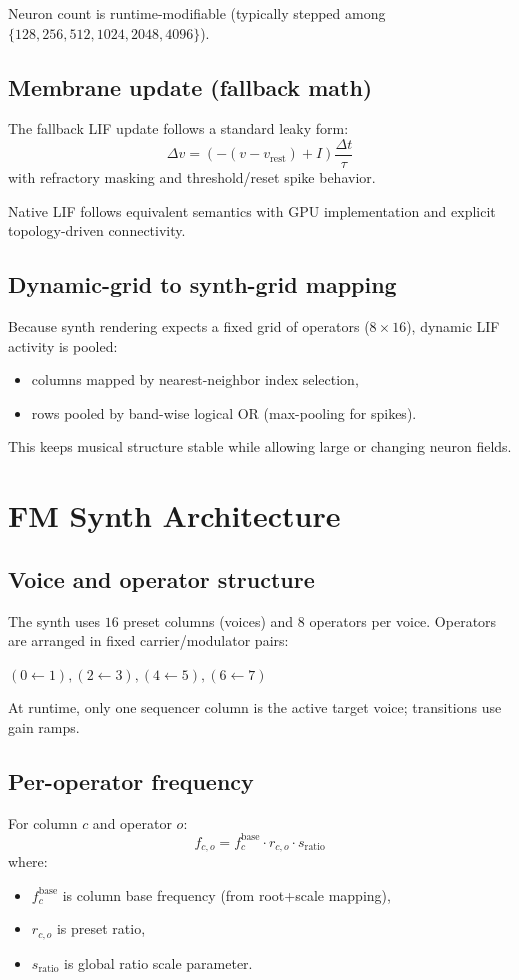 \documentclass[11pt,a4paper]{article}
\begin{document}
Neuron count is runtime-modifiable (typically stepped among $\{128,256,512,1024,2048,4096\}$).

\subsection{Membrane update (fallback math)}
The fallback LIF update follows a standard leaky form:
\begin{equation}
\Delta v = \left(-(v-v_{\mathrm{rest}}) + I\right)\frac{\Delta t}{\tau}
\end{equation}
with refractory masking and threshold/reset spike behavior.

Native LIF follows equivalent semantics with GPU implementation and explicit topology-driven connectivity.

\subsection{Dynamic-grid to synth-grid mapping}
Because synth rendering expects a fixed grid of operators ($8 \times 16$), dynamic LIF activity is pooled:
\begin{itemize}
    \item columns mapped by nearest-neighbor index selection,
    \item rows pooled by band-wise logical OR (max-pooling for spikes).
\end{itemize}

This keeps musical structure stable while allowing large or changing neuron fields.

\section{FM Synth Architecture}
\subsection{Voice and operator structure}
The synth uses $16$ preset columns (voices) and $8$ operators per voice.
Operators are arranged in fixed carrier/modulator pairs:
\begin{center}
$(0 \leftarrow 1), (2 \leftarrow 3), (4 \leftarrow 5), (6 \leftarrow 7)$
\end{center}

At runtime, only one sequencer column is the active target voice; transitions use gain ramps.

\subsection{Per-operator frequency}
For column $c$ and operator $o$:
\begin{equation}
f_{c,o} = f^{\mathrm{base}}_c \cdot r_{c,o} \cdot s_{\mathrm{ratio}}
\end{equation}
where:
\begin{itemize}
    \item $f^{\mathrm{base}}_c$ is column base frequency (from root+scale mapping),
    \item $r_{c,o}$ is preset ratio,
    \item $s_{\mathrm{ratio}}$ is global ratio scale parameter.
\end{itemize}
\end{document}
